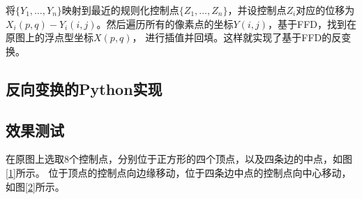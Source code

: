 \documentclass{article}
\begin{document}
将$\{Y_1,\dots,Y_n\}$映射到最近的规则化控制点$\{Z_1,\dots,Z_n\}$，并设控制点$Z_i$对应的位移为
$X_i(p,q)-Y_i(i,j)$。然后遍历所有的像素点的坐标$Y(i,j)$，基于FFD，找到在原图上的浮点型坐标$X(p,q)$，
进行插值并回填。这样就实现了基于FFD的反变换。

\subsection{反向变换的Python实现}

 

\subsection{效果测试}
在原图上选取8个控制点，分别位于正方形的四个顶点，以及四条边的中点，如图\ref{1}所示。
位于顶点的控制点向边缘移动，位于四条边中点的控制点向中心移动，如图\ref{2}所示。

\begin{figure}[H]
    \centering
    \,    
\end{figure}
\end{document}
